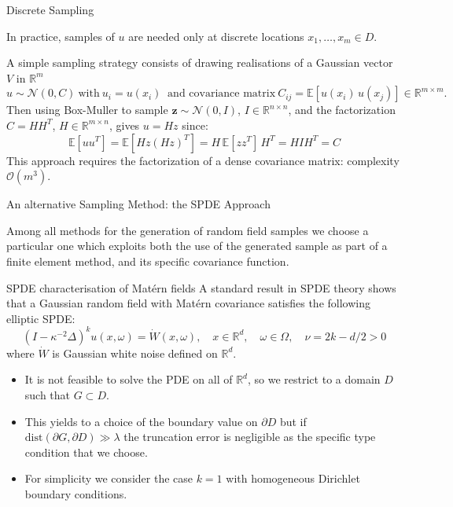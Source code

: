 \documentclass[
  english,            %
  aspectratio=169,    %
]{tumbeamer}
\begin{document}
\begin{frame}{Discrete Sampling}

\bigskip
In practice, samples of $u$ are needed only at discrete locations $x_1,\dots,x_m \in D$. 

\bigskip
A simple sampling strategy consists of drawing realisations of a Gaussian vector \( V\) in \( \mathbb{R}^m \)
\[ u \sim \mathcal{N}(0,C) \ \text{with} \ u_i = u(x_i) \ \text{ and covariance matrix} \ C_{ij} = \mathbb{E}[u(x_i)\,u(x_j)] \in \mathbb{R}^{m\times m}.\]
Then using Box-Muller to sample $\mathbf{z} \sim \mathcal{N}(0,I)$, $I \in \mathbb{R}^{n\times n}$, and the factorization $C = HH^T$, $H \in \mathbb{R}^{m\times n}$, gives $u = Hz$ since:
\begin{equation}
  \mathbb{E}[uu^T] = \mathbb{E}[Hz(Hz)^T]
  = H\,\mathbb{E}[zz^T]\,H^T = HIH^T = C
\end{equation}
This approach requires the factorization of a dense covariance matrix:
complexity $\mathcal{O}(m^3)$.
\end{frame}


\begin{frame}{An alternative Sampling Method: the SPDE Approach}

Among all methods for the generation of random field samples we choose a particular one which exploits both the use of the generated sample as part of a finite element method, and its specific covariance function.

\begin{block}{SPDE characterisation of Mat\'ern fields}
A standard result in SPDE theory shows that a Gaussian random field with Mat\'ern covariance
satisfies the following elliptic SPDE:
\begin{equation}
  (I - \kappa^{-2}\Delta)^k u(x,\omega) = \dot{W}(x,\omega),
  \quad x \in \mathbb{R}^d,\quad \omega \in \Omega,\quad \nu = 2k - d/2 > 0
\end{equation}
where $\dot{W}$ is Gaussian white noise defined on $\mathbb{R}^d$. 
\end{block}

\end{frame}

\begin{frame}
\bigskip
\bigskip
\begin{itemize}
\bigskip
\item It is not feasible to solve the PDE on all of $\mathbb{R}^d$, so we restrict to a domain $D$ such that $G \subset D$.
\bigskip
\item This yields to a choice of the boundary value on \(\partial D\) but if
$\mathrm{dist}(\partial G, \partial D) \gg \lambda$ the truncation error is negligible as the specific type condition that we choose. 
\bigskip
\item For simplicity we consider the case $k=1$ with homogeneous Dirichlet boundary conditions. 


\end{itemize}

\end{frame}
\end{document}
